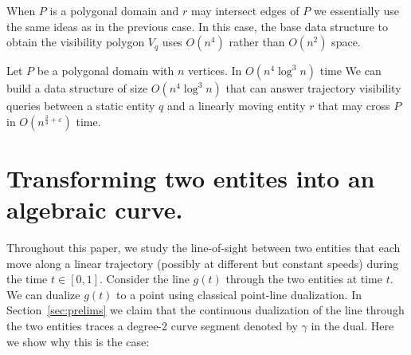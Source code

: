 \documentclass[UKenglish]{lipics-v2019}
\newcommand{\eps}{\ensuremath{\varepsilon}\xspace}
\begin{document}
When $P$ is a polygonal domain and $r$ may intersect edges of $P$ we essentially use the same ideas as in the previous case. In this case, the base data structure to obtain the visibility polygon $V_q$ uses $O(n^4)$ rather than $O(n^2)$ space.

\begin{theorem} 
\label{thm:full_domain}
  Let $P$ be a polygonal domain with $n$ vertices. In $O(n^4\log^3 n)$ time We
  can build a data structure of size $O(n^4\log^3 n)$ that can answer
  trajectory visibility queries between a static entity $q$ and a linearly
  moving entity $r$ that may cross $P$ in $O(n^{\frac{3}{4}+\eps})$ time.    
\end{theorem}
 
 
 
 
 
 
 
 
 
 
 
 
 






\newpage



\newpage
\appendix

\section{Transforming two entites into an algebraic curve.}
\label{app:hyperbola}


Throughout this paper, we study the line-of-sight between two entities that each move along a linear trajectory (possibly at different but constant speeds) during the time $t \in [0,1]$. Consider the line $g(t)$ through the two entities at time $t$. We can dualize $g(t)$ to a point using classical point-line dualization. In Section~\ref{sec:prelims} we claim that the continuous dualization of the line through the two entities traces a degree-2 curve segment denoted by $\gamma$ in the dual. Here we show why this is the case:
\end{document}
